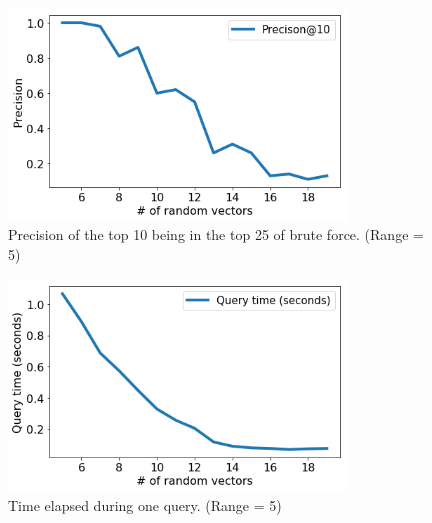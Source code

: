 \documentclass[12pt]{scrreprt}
\begin{document}
\begin{figure}[H]
  \begin{center}
    \caption{Precision of the top 10 being in the top 25 of brute force. (Range = 5)}
    \label{fig:pressision_2}
    \includegraphics[width=0.8\textwidth, angle=0]{output/output_108_1.png}
  \end{center}
\end{figure}
\begin{figure}[H]
  \begin{center}
    \caption{Time elapsed during one query. (Range = 5)}
    \label{fig:speed_2}
    \includegraphics[width=0.8\textwidth, angle=0]{output/output_108_2.png}
  \end{center}
\end{figure} 
\end{document}
